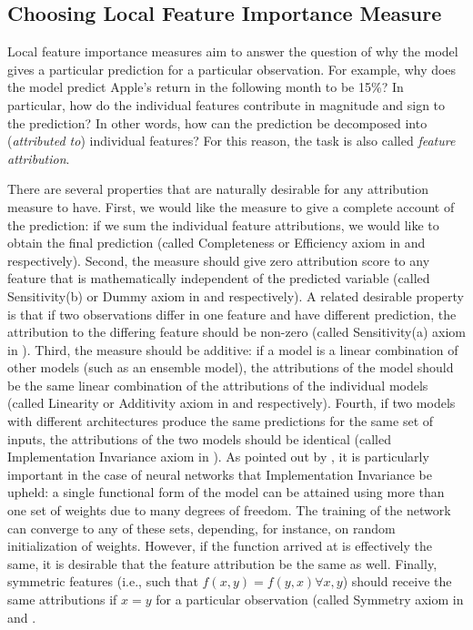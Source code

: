 {				
		\subsection{Choosing Local Feature Importance Measure}
			Local feature importance measures aim to answer the question of why the model gives a particular prediction for a particular observation. For example, why does the model predict Apple's return in the following month to be 15\%? In particular, how do the individual features contribute in magnitude and sign to the prediction? In other words, how can the prediction be decomposed into (\textit{attributed to}) individual features? For this reason, the task is also called \textit{feature attribution}.  
			
			There are several properties that are naturally desirable for any attribution measure to have. First, we would like the measure to give a complete account of the prediction: if we sum the individual feature attributions, we would like to obtain the final prediction (called Completeness or Efficiency axiom in \cite{sundararajan2017axiomatic} and \cite{molnar2020interpretable} respectively). Second, the measure should give zero attribution score to any feature that is mathematically independent of the predicted variable (called Sensitivity(b) or Dummy axiom in \cite{sundararajan2017axiomatic} and \cite{molnar2020interpretable} respectively). A related desirable property is that if two observations differ in one feature and have different prediction, the attribution to the differing feature should be non-zero (called Sensitivity(a) axiom in \cite{sundararajan2017axiomatic}). Third, the measure should be additive: if a model is a linear combination of other models (such as an ensemble model), the attributions of the model should be the same linear combination of the attributions of the individual models (called Linearity or Additivity axiom in \cite{sundararajan2017axiomatic} and \cite{molnar2020interpretable} respectively). Fourth, if two models with different architectures produce the same predictions for the same set of inputs, the attributions of the two models should be identical (called Implementation Invariance axiom in \cite{sundararajan2017axiomatic}). As pointed out by \cite{sundararajan2017axiomatic}, it is particularly important in the case of neural networks that Implementation Invariance be upheld: a single functional form of the model can be attained using more than one set of weights due to many degrees of freedom. The training of the network can converge to any of these sets, depending, for instance, on random initialization of weights. However, if the function arrived at is effectively the same, it is desirable that the feature attribution be the same as well. Finally, symmetric features (i.e., such that $f(x,y) = f(y,x) \forall x, y$) should receive the same attributions if $x=y$ for a particular observation (called Symmetry axiom in \cite{shrikumar2017learning} and  \cite{molnar2020interpretable}. 
			
}
